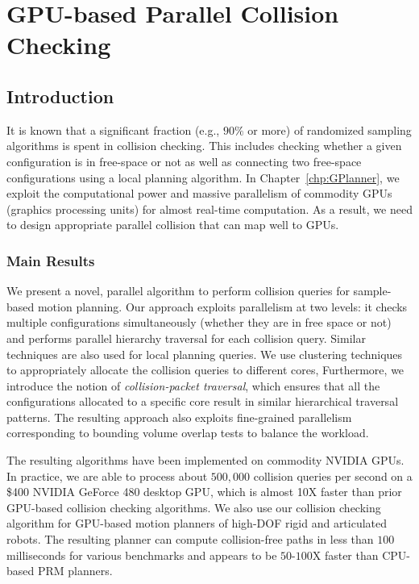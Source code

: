 \chapter{GPU-based Parallel Collision Checking} 
\label{chp:GCollide}


\section{Introduction}
It is known that a significant fraction (e.g., $90\%$ or more) of randomized sampling algorithms is
spent in collision checking. This includes checking whether a given configuration is in free-space or not
as well as connecting two free-space configurations using a local planning algorithm. In Chapter~\ref{chp:GPlanner}, we exploit the computational power and massive parallelism of commodity GPUs (graphics processing units) for almost real-time
computation. As a result, we need to design appropriate parallel collision that can map well to GPUs.

\subsection{Main Results}
We present a novel, parallel algorithm to perform collision queries for sample-based
motion planning. Our approach exploits parallelism at two levels: it checks multiple configurations simultaneously (whether they are in free space or not) and performs parallel hierarchy traversal for each collision query.
Similar techniques are also used for local planning queries. We use clustering techniques to appropriately
allocate the collision queries to different cores, Furthermore, we introduce the notion of \emph{collision-packet traversal},
which ensures that all the configurations allocated to a specific core result in similar hierarchical traversal
patterns. The resulting approach also exploits fine-grained parallelism corresponding to bounding volume overlap tests
to balance the workload.

The resulting algorithms have been implemented on commodity NVIDIA GPUs. In practice, we are able to process about
$500,000$ collision queries per second on a \$400 NVIDIA GeForce 480 desktop GPU, which is almost 10X faster than prior GPU-based collision checking algorithms. We also use our collision checking algorithm for GPU-based motion planners of high-DOF
rigid and articulated robots.
The resulting planner can compute collision-free paths in less than $100$ milliseconds for various benchmarks and
appears to be $50\text{-}100$X faster than CPU-based PRM planners.

